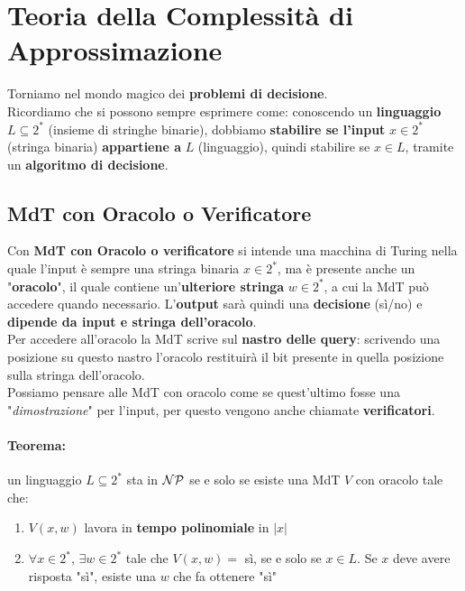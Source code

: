 
\section{Teoria della Complessità di Approssimazione}


 

Torniamo nel mondo magico dei \textbf{problemi di decisione}. \\

Ricordiamo che si possono sempre esprimere come: conoscendo un \textbf{linguaggio} $L \subseteq 2^\ast$ (insieme di stringhe binarie), dobbiamo \textbf{stabilire se l'input} $x \in 2^\ast$ (stringa binaria) \textbf{appartiene a} $L$ (linguaggio), quindi stabilire se $x \in L$, tramite un \textbf{algoritmo di decisione}.\\

\subsection{MdT con Oracolo o Verificatore}

Con \textbf{MdT con Oracolo o verificatore} si intende una macchina di Turing nella quale l'input è sempre una stringa binaria $x \in 2^\ast$, ma è presente anche un "\textbf{oracolo}", il quale contiene un'\textbf{ulteriore stringa} $w \in 2^\ast$, a cui la MdT può accedere quando necessario. L'\textbf{output} sarà quindi una \textbf{decisione} (sì/no) e \textbf{dipende da input e stringa dell'oracolo}.\\

Per accedere all'oracolo la MdT scrive sul \textbf{nastro delle query}: scrivendo una posizione su questo nastro l'oracolo restituirà il bit presente in quella posizione sulla stringa dell'oracolo.\\

Possiamo pensare alle MdT con oracolo come se quest'ultimo fosse una "\textit{dimostrazione}" per l'input, per questo vengono anche chiamate \textbf{verificatori}.\\

\paragraph{Teorema:} un linguaggio $L \subseteq 2^\ast$ sta in $\mathcal{NP}$ se e solo se esiste una MdT $V$ con oracolo tale che: 
\begin{enumerate}
	\item $V(x,w)$ lavora in \textbf{tempo polinomiale} in $|x|$
	\item $\forall x \in 2^\ast$, $\exists w \in 2^\ast$ tale che $V(x,w) = $ sì, se e solo se $x \in L$. Se $x$ deve avere risposta "sì", esiste una $w$ che fa ottenere "sì"
\end{enumerate}

